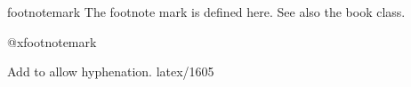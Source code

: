  \begin{docCommand}{footnotemark}{}
  The footnote mark is defined here. See also the book class.
    \begin{teX}
\def\footnotemark{%
   \@ifnextchar[\@xfootnotemark
     {\stepcounter{footnote}%
      \protected@xdef\@thefnmark{\thefootnote}%
      \@footnotemark}}
    \end{teX}
  \end{docCommand}

 \begin{docCommand}{@xfootnotemark}{}
    \begin{teX}
\def\@xfootnotemark[#1]{%
   \begingroup 
      \c@footnote #1\relax
      \unrestored@protected@xdef\@thefnmark{\thefootnote}%
   \endgroup
   \@footnotemark}
    \end{teX}
 \end{docCommand}

 \begin{macro}{\@footnotemark}
 {Add  to allow hyphenation. latex/1605}
    \begin{teX}
\def\@footnotemark{%
  \leavevmode
  \ifhmode\edef\@x@sf{\the\spacefactor}\nobreak\fi
  \@makefnmark
  \ifhmode\spacefactor\@x@sf\fi
  \relax}
    \end{teX}
 \end{macro}

 \begin{macro}{\footnotetext}
    \begin{teX}
\def\footnotetext{%
     \@ifnextchar [\@xfootnotenext
       {\protected@xdef\@thefnmark{\thempfn}%
    \@footnotetext}}
    \end{teX}
 \end{macro}

 \begin{macro}{\@xfootnotenext}
    \begin{teX}
\def\@xfootnotenext[#1]{%
  \begingroup 
     \csname c@\@mpfn\endcsname #1\relax
     \unrestored@protected@xdef\@thefnmark{\thempfn}%
  \endgroup
  \@footnotetext}
    \end{teX}
 \end{macro}

 \begin{macro}{\thempfn}
 \begin{macro}{\@mpfn}
    \begin{teX}
\def\@mpfn{footnote}
\def\thempfn{\thefootnote}

    \end{teX}
 \end{macro}
 \end{macro}


